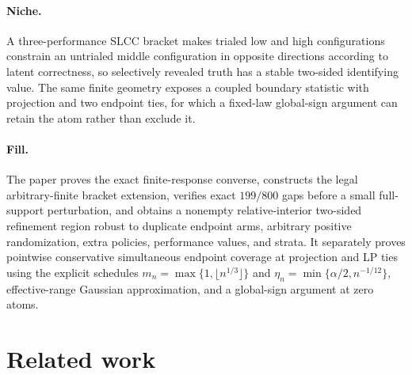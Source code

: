 \documentclass{article}
\begin{document}
\paragraph{Niche.} A three-performance SLCC bracket makes trialed low and high configurations constrain an untrialed middle configuration in opposite directions according to latent correctness, so selectively revealed truth has a stable two-sided identifying value. The same finite geometry exposes a coupled boundary statistic with projection and two endpoint ties, for which a fixed-law global-sign argument can retain the atom rather than exclude it.

\paragraph{Fill.} The paper proves the exact finite-response converse, constructs the legal arbitrary-finite bracket extension, verifies exact \(199/800\) gaps before a small full-support perturbation, and obtains a nonempty relative-interior two-sided refinement region robust to duplicate endpoint arms, arbitrary positive randomization, extra policies, performance values, and strata. It separately proves pointwise conservative simultaneous endpoint coverage at projection and LP ties using the explicit schedules \(m_n=\max\{1,\lfloor n^{1/3}\rfloor\}\) and \(\eta_n=\min\{\alpha/2,n^{-1/12}\}\), effective-range Gaussian approximation, and a global-sign argument at zero atoms.

\section{Related work}
\end{document}
